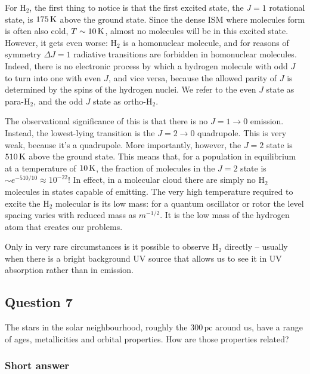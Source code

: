\documentclass[a4paper,10pt]{article}
\begin{document}
{\noindent}For H$_2$, the first thing to notice is that the first excited state, the $J=1$ rotational state, is $175\,{\rm K}$ above the ground state. Since the dense ISM where molecules form is often also cold, $T\sim10\,{\rm K}$, almost no molecules will be in this excited state. However, it gets even worse: H$_2$ is a homonuclear molecule, and for reasons of symmetry $\Delta J=1$ radiative transitions are forbidden in homonuclear molecules. Indeed, there is no electronic process by which a hydrogen molecule with odd $J$ to turn into one with even $J$, and vice versa, because the allowed parity of $J$ is determined by the spins of the hydrogen nuclei. We refer to the even $J$ state as para-H$_2$, and the odd $J$ state as ortho-H$_2$.

{\noindent}The observational significance of this is that there is no $J=1\rightarrow0$ emission. Instead, the lowest-lying transition is the $J=2\rightarrow0$ quadrupole. This is very weak, because it's a quadrupole. More importantly, however, the $J=2$ state is $510\,{\rm K}$ above the ground state. This means that, for a population in equilibrium at a temperature of $10\,{\rm K}$, the fraction of molecules in the $J=2$ state is
$\sim e^{-510/10}\approx10^{-22}$! In effect, in a molecular cloud there are simply no H$_2$ molecules in states capable of emitting. The very high temperature required to excite the H$_2$ molecular is its low mass: for a quantum oscillator or rotor the level spacing varies with reduced mass as $m^{-1/2}$. It is the low mass of the hydrogen atom that creates our problems.

{\noindent}Only in very rare circumstances is it possible to observe H$_2$ directly -- usually when there is a bright background UV source that allows us to see it in UV absorption rather than in emission. 


\newpage
\subsection{Question 7}

The stars in the solar neighbourhood, roughly the $300\,\mathrm{pc}$ around us, have a range of ages, metallicities and orbital properties. How are those properties related?

\subsubsection{Short answer}
\end{document}
